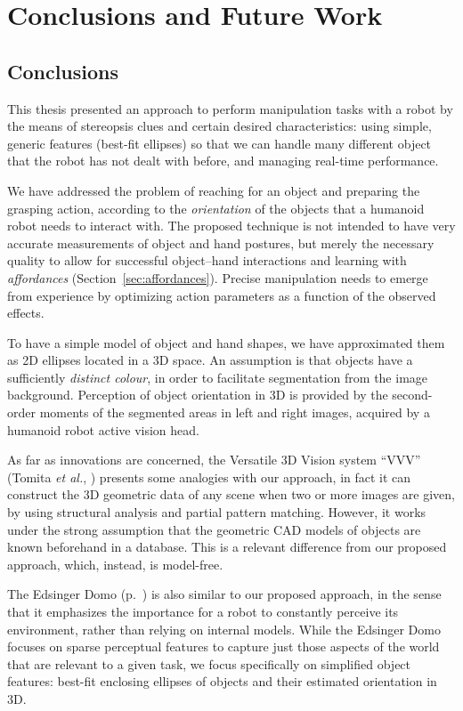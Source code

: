 
\chapter{Conclusions and Future Work}
\label{chap:conclusions}

\section{Conclusions}

This thesis presented an approach to perform manipulation tasks with a robot by the means of stereopsis clues and certain desired characteristics: using simple, generic features (best-fit ellipses) so that we can handle many different object that the robot has not dealt with before, and managing real-time performance.

We have addressed the problem of reaching for an object and preparing the grasping action, according to the \emph{orientation} of the objects that a humanoid robot needs to interact with. The proposed technique is not intended to have very accurate measurements of object and hand postures, but merely the necessary quality to allow for successful object--hand interactions and learning with \emph{affordances} (Section~\ref{sec:affordances}). Precise manipulation needs to emerge from experience by optimizing action parameters as a function of the observed effects.

To have a simple model of object and hand shapes, we have approximated them as 2D ellipses located in a 3D space. An assumption is that objects have a sufficiently \emph{distinct colour}, in order to facilitate segmentation from the image background. Perception of object orientation in 3D is provided by the second-order moments of the segmented areas in left and right images, acquired by a humanoid robot active vision head.

As far as innovations are concerned, the Versatile 3D Vision system ``VVV'' (Tomita \emph{et al.}, \cite{tomita:1998}) presents some analogies with our approach, in fact it can construct the 3D geometric data of any scene when two or more images are given, by using structural analysis and partial pattern matching. However, it works under the strong assumption that the geometric CAD models of objects are known beforehand in a database. This is a relevant difference from our proposed approach, which, instead, is model-free.

The Edsinger Domo (p.~\pageref{chap:related_work}) is also similar to our proposed approach, in the sense that it emphasizes the importance for a robot to constantly perceive its environment, rather than relying on internal models. While the Edsinger Domo focuses on sparse perceptual features to capture just those aspects of the world that are relevant to a given task, we focus specifically on simplified object features: best-fit enclosing ellipses of objects and their estimated orientation in 3D.

